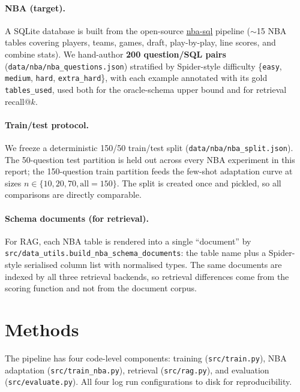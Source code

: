 \documentclass[11pt,a4paper]{article}
\begin{document}
\paragraph{NBA (target).}
A SQLite database is built from the open-source
\href{https://github.com/mpope9/nba-sql}{nba-sql} pipeline ($\sim$15 NBA tables
covering players, teams, games, draft, play-by-play, line scores, and
combine stats). We hand-author \textbf{200 question/SQL pairs}
(\texttt{data/nba/nba\_questions.json}) stratified by Spider-style difficulty
\{\texttt{easy}, \texttt{medium}, \texttt{hard}, \texttt{extra\_hard}\}, with
each example annotated with its gold \texttt{tables\_used}, used both for the
oracle-schema upper bound and for retrieval recall@$k$.

\paragraph{Train/test protocol.}
We freeze a deterministic 150/50 train/test split
(\texttt{data/nba/nba\_split.json}). The 50-question test partition is held
out across every NBA experiment in this report; the 150-question train
partition feeds the few-shot adaptation curve at sizes
$n\in\{10,20,70,\text{all}{=}150\}$. The split is created once and pickled, so
all comparisons are directly comparable.

\paragraph{Schema documents (for retrieval).}
For RAG, each NBA table is rendered into a single ``document'' by
\texttt{src/data\_utils.build\_nba\_schema\_documents}: the table name plus a
Spider-style serialised column list with normalised types. The same documents
are indexed by all three retrieval backends, so retrieval differences come from
the scoring function and not from the document corpus.

\section{Methods}
\label{sec:methods}

The pipeline has four code-level components: training (\texttt{src/train.py}),
NBA adaptation (\texttt{src/train\_nba.py}), retrieval (\texttt{src/rag.py}),
and evaluation (\texttt{src/evaluate.py}). All four log run configurations to
disk for reproducibility.
\end{document}
